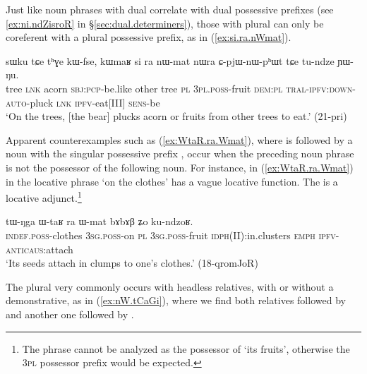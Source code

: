 Just like noun phrases with dual  correlate with dual possessive prefixes (see \ref{ex:ni.ndZisroR} in §\ref{sec:dual.determiners}), those with plural  can only be coreferent with a plural possessive prefix, as  in (\ref{ex:si.ra.nWmat}).
\largerpage
\begin{exe}
\ex \label{ex:si.ra.nWmat}
 \gll  sɯku tɕe tʰɣe kɯ-fse, kɯmaʁ si ra nɯ-mat nɯra ɕ-pjɯ-nɯ-pʰɯt tɕe tu-ndze ɲɯ-ŋu.\\
tree \textsc{lnk} acorn \textsc{sbj}:\textsc{pcp}-be.like other tree \textsc{pl} \textsc{3pl}.\textsc{poss}-fruit \textsc{dem}:\textsc{pl} \textsc{tral}-\textsc{ipfv}:\textsc{down}-\textsc{auto}-pluck \textsc{lnk} \textsc{ipfv}-eat[III] \textsc{sens}-be \\
\glt `On the trees, [the bear] plucks acorn or fruits from other trees to eat.' (21-pri)
\end{exe}

Apparent counterexamples such as (\ref{ex:WtaR.ra.Wmat}), where  is followed by a noun with the singular possessive prefix , occur when the preceding noun phrase is not the possessor of the following noun. For instance, in (\ref{ex:WtaR.ra.Wmat})  in the locative phrase  `on the clothes' has a vague locative function. The   is a locative adjunct.\footnote{The phrase   cannot be analyzed as the possessor of  `its fruits', otherwise the \textsc{3pl} possessor prefix  would be expected. }

\begin{exe}
\ex \label{ex:WtaR.ra.Wmat}
 \gll tɯ-ŋga ɯ-taʁ ra ɯ-mat bɤbɤβ ʑo ku-ndzoʁ. \\
 \textsc{indef}.\textsc{poss}-clothes \textsc{3sg}.\textsc{poss}-on \textsc{pl} \textsc{3sg}.\textsc{poss}-fruit \textsc{idph}(II):in.clusters \textsc{emph} \textsc{ipfv}-\textsc{anticaus}:attach \\
\glt `Its seeds attach in clumps to one's clothes.' (18-qromJoR)
\end{exe}

The plural  very commonly occurs with headless relatives, with or without a demonstrative, as in (\ref{ex:nW.tCaGi}), where we find both relatives followed by  and another one followed by .

